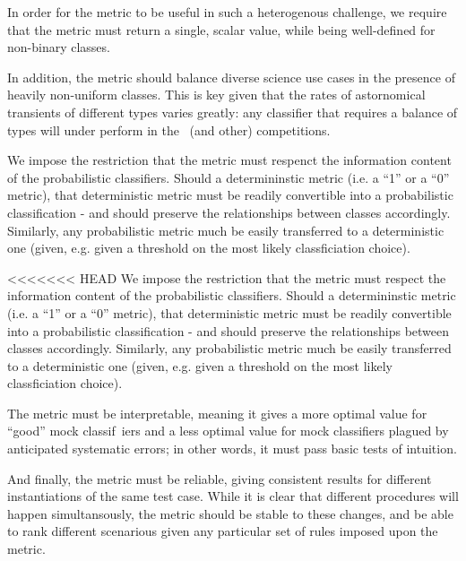 In order for the metric to be useful in such a heterogenous challenge, we require that the metric must return a single, scalar value, while being well-defined for non-binary classes.

In addition, the metric should balance diverse science use cases in the presence of heavily non-uniform classes.
This is key given that the rates of astornomical transients of different types varies greatly: any classifier that requires a balance of types will under perform in the \plasticc\ (and other) competitions.

We impose the restriction that the metric must respenct the information content of the probabilistic classifiers.
Should a determininstic metric (i.e. a ``1'' or a ``0'' metric), that deterministic metric must be readily convertible into a probabilistic classification - and should preserve the relationships between classes accordingly.
Similarly, any probabilistic metric much be easily transferred to a deterministic one (given, e.g. given a threshold on the most likely classficiation choice).

<<<<<<< HEAD
We impose the restriction that the metric must respect the information content of the probabilistic classifiers. Should a determininstic metric (i.e. a ``1'' or a ``0'' metric), that deterministic metric must be readily convertible into a probabilistic classification - and should preserve the relationships between classes accordingly. Similarly, any probabilistic metric much be easily transferred to a deterministic one (given, e.g. given a threshold on the most likely classficiation choice).

The metric must be interpretable, meaning it gives a more optimal value for ``good'' mock classif\
iers and a less optimal value for mock classifiers plagued by anticipated systematic errors; in other words, it must pass basic tests of intuition.

And finally, the metric must be reliable, giving consistent results for different instantiations of the same test case. While it is clear that different procedures will happen simultansously, the metric should be stable to these changes, and be able to rank different scenarious given any particular set of rules imposed upon the metric.

